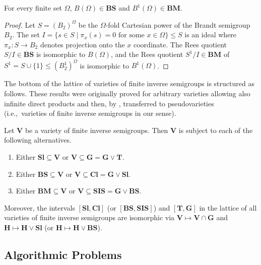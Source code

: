 \documentclass[anonymous,letter,UKenglish,cleveref,autoref,thm-restate]{lipics-v2021}
\renewcommand{\leq}{\leqslant}
\newcommand{\ie}{i.e.,~}
\newcommand{\sse}{\subseteq}
\newcommand{\vV}{\ensuremath{\mathbf{V}}}
\newcommand{\vT}{\ensuremath{\mathbf{T}}}
\newcommand{\vH}{\ensuremath{\mathbf{H}}}
\newcommand{\vG}{\ensuremath{\mathbf{G}}}
\newcommand{\vSl}{\ensuremath{\mathbf{Sl}}}
\newcommand{\vCl}{\ensuremath{\mathbf{Cl}}}
\newcommand{\vSI}{\ensuremath{\mathbf{SIS}}}
\newcommand{\vBS}{\ensuremath{\mathbf{BS}}}  \newcommand{\vBM}{\ensuremath{\mathbf{BM}}}
\theoremstyle{plain}
\theoremstyle{plain}
\begin{document}
\begin{lemma}\label{lem:b2_implies_bn}
	For every finite set $\Omega$, $B(\Omega) \in \vBS$ and $B^1(\Omega) \in \vBM$.
\end{lemma}
\begin{proof}
  Let $S = (B_2)^{\Omega}$ be the $\Omega$-fold Cartesian power of the Brandt semigroup $B_2$.
  The set $I = \{ s \in S \mid \pi_x(s) = 0\text{ for some }x \in \Omega\} \leq S$ is an ideal where $\pi_x \colon S \to B_2$ denotes projection onto the $x$ coordinate.
  The Rees quotient $S / I \in \vBS$ is isomorphic to $B(\Omega)$, and the Rees quotient $S^1 / I \in \vBM$ of $S^1 = S \cup \{ 1 \} \leq (B^1_2)^\Omega$ is isomorphic to $B^1(\Omega)$.
\end{proof}

The bottom of the lattice of varieties of finite inverse semigroups is structured as follows. 
These results were originally proved for arbitrary varieties allowing also infinite direct products and then, by \cite{HallJohnston89}, transferred to pseudovarieties (\ie varieties  of finite inverse semigroups in our sense).

\begin{proposition}\label{pro:varieties}
  Let $\vV$ be a variety of finite inverse semigroups.
  Then $\vV$ is subject to each of the following alternatives.
  \begin{enumerate}
    \item Either $\vSl \sse \vV$ or $\vV \sse \vG = \vG \vee \vT$.
    \item Either $\vBS \sse \vV$ or $\vV \sse \vCl = \vG \vee \vSl$.
    \item Either $\vBM \sse \vV$ or $\vV \sse \vSI = \vG \vee \vBS$.
  \end{enumerate}\smallskip
  \hspace{\parindent}Moreover, the intervals $[\vSl, \vCl]$ (or $[\vBS, \vSI]$) and $[\vT, \vG]$ in the lattice of all varieties of finite inverse semigroups are isomorphic via $\vV \mapsto \vV \cap \vG$ and $\vH \mapsto \vH \vee \vSl$ (or $\vH \mapsto \vH \vee \vBS$).
\end{proposition}





\subsection{Algorithmic Problems}
\label{sec:prelims-problems}
\end{document}

